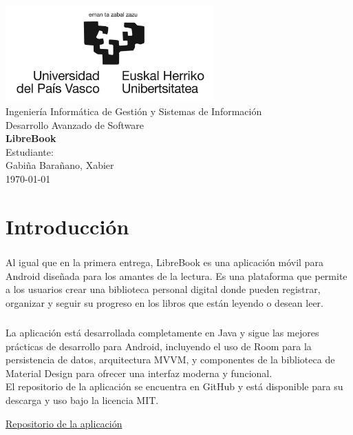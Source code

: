 \documentclass[a4paper,12pt]{report}
\begin{document}
  \begin{titlepage}
      \centering
      \includegraphics[width=0.6\textwidth]{./.img/logo.jpg}\\
      \vspace{1cm}
      \Large Ingeniería Informática de Gestión y Sistemas de Información\\
      \vspace{3cm}
      \Huge Desarrollo Avanzado de Software\\
      \vspace{0.5cm}
      \huge \textbf{LibreBook}\\
      \vspace{7.5cm}
      \Large Estudiante:\\
      \vspace{0.2cm}
      \large Gabiña Barañano, Xabier\\
      \vspace{1cm}
      \vfill
      \today
  \end{titlepage}
  \tableofcontents
  \listoffigures
  \chapter{Introducción}
    \paragraph*{}{
      Al igual que en la primera entrega, LibreBook es una aplicación móvil para Android diseñada para los amantes de la lectura. Es una plataforma que permite a los usuarios crear una biblioteca personal digital donde pueden registrar, organizar y seguir su progreso en los libros que están leyendo o desean leer.
    }
    \paragraph*{}{
      La aplicación está desarrollada completamente en Java y sigue las mejores prácticas de desarrollo para Android, incluyendo el uso de Room para la persistencia de datos\cite{room_documentation}, arquitectura MVVM\cite{mvvm_pattern}, y componentes de la biblioteca de Material Design\cite{material_design} para ofrecer una interfaz moderna y funcional.\\
      El repositorio de la aplicación se encuentra en GitHub y está disponible para su descarga y uso bajo la licencia MIT.
    }
    \begin{center}
        \color{blue}\href{https://github.com/Xabierland/DAS-Proyecto}{Repositorio de la aplicación}
    \end{center}
\end{document}
